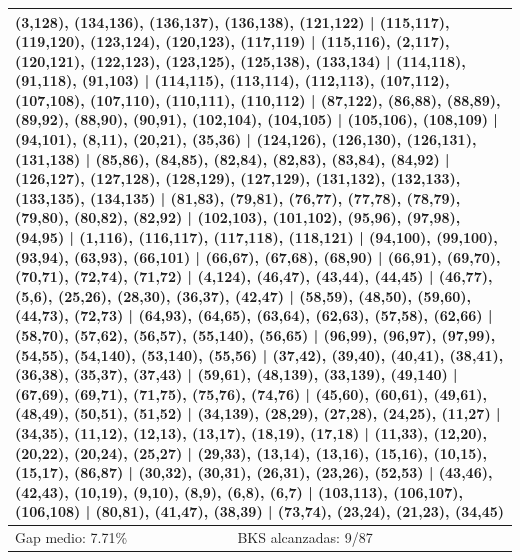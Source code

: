 \begin{longtable}{lrrrrrrrrl}
\multicolumn{10}{p{0.96\linewidth}}{\tiny\raggedright\arraybackslash (3,128), (134,136), (136,137), (136,138), (121,122) | (115,117), (119,120), (123,124), (120,123), (117,119) | (115,116), (2,117), (120,121), (122,123), (123,125), (125,138), (133,134) | (114,118), (91,118), (91,103) | (114,115), (113,114), (112,113), (107,112), (107,108), (107,110), (110,111), (110,112) | (87,122), (86,88), (88,89), (89,92), (88,90), (90,91), (102,104), (104,105) | (105,106), (108,109) | (94,101), (8,11), (20,21), (35,36) | (124,126), (126,130), (126,131), (131,138) | (85,86), (84,85), (82,84), (82,83), (83,84), (84,92) | (126,127), (127,128), (128,129), (127,129), (131,132), (132,133), (133,135), (134,135) | (81,83), (79,81), (76,77), (77,78), (78,79), (79,80), (80,82), (82,92) | (102,103), (101,102), (95,96), (97,98), (94,95) | (1,116), (116,117), (117,118), (118,121) | (94,100), (99,100), (93,94), (63,93), (66,101) | (66,67), (67,68), (68,90) | (66,91), (69,70), (70,71), (72,74), (71,72) | (4,124), (46,47), (43,44), (44,45) | (46,77), (5,6), (25,26), (28,30), (36,37), (42,47) | (58,59), (48,50), (59,60), (44,73), (72,73) | (64,93), (64,65), (63,64), (62,63), (57,58), (62,66) | (58,70), (57,62), (56,57), (55,140), (56,65) | (96,99), (96,97), (97,99), (54,55), (54,140), (53,140), (55,56) | (37,42), (39,40), (40,41), (38,41), (36,38), (35,37), (37,43) | (59,61), (48,139), (33,139), (49,140) | (67,69), (69,71), (71,75), (75,76), (74,76) | (45,60), (60,61), (49,61), (48,49), (50,51), (51,52) | (34,139), (28,29), (27,28), (24,25), (11,27) | (34,35), (11,12), (12,13), (13,17), (18,19), (17,18) | (11,33), (12,20), (20,22), (20,24), (25,27) | (29,33), (13,14), (13,16), (15,16), (10,15), (15,17), (86,87) | (30,32), (30,31), (26,31), (23,26), (52,53) | (43,46), (42,43), (10,19), (9,10), (8,9), (6,8), (6,7) | (103,113), (106,107), (106,108) | (80,81), (41,47), (38,39) | (73,74), (23,24), (21,23), (34,45)} \\[2pt]
\midrule
\multicolumn{3}{l}{Gap medio: 7.71\%} & \multicolumn{7}{l}{BKS alcanzadas: 9/87} \\
\end{longtable}
\endgroup